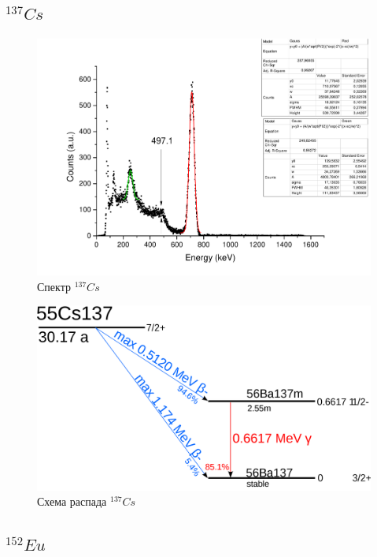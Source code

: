\documentclass[a4paper,12pt]{article}
\begin{document}
	   \pagebreak
	        
	   \subsection{$^{137}Cs$}
	    
	        \begin{figure}[h!]
	            \centering
	            \includegraphics[width=\linewidth]{cs137.pdf}
	            \caption{Спектр $^{137}Cs$}
	            \label{cs137_e}
	        \end{figure}
	        
	        \begin{figure}[h!]
	            \centering
	            \includegraphics[width=0.4\linewidth]{2000px-Cs-137-decay.png}
	            \caption{Схема распада $^{137}Cs$}
	            \label{cs137_d}
	        \end{figure}
	       
	   \pagebreak
	   
	       
	   \subsection{$^{152}Eu$}
	    
\end{document}
